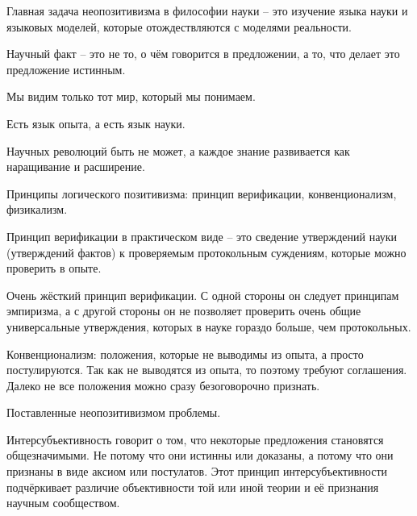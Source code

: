 \documentclass[main.tex]{subfiles}
\begin{document}
Главная задача неопозитивизма в философии науки -- это изучение языка науки и языковых моделей, которые отождествляются с моделями реальности.




Научный факт -- это не то, о чём говорится в предложении, а то, что делает это предложение истинным.

Мы видим только тот мир, который мы понимаем.

Есть язык опыта, а есть язык науки.

Научных революций быть не может, а каждое знание развивается как наращивание и расширение.

Принципы логического позитивизма: принцип верификации, конвенционализм, физикализм.



Принцип верификации в практическом виде -- это сведение утверждений науки (утверждений фактов) к проверяемым протокольным суждениям, которые можно проверить в опыте.

Очень жёсткий принцип верификации.
С одной стороны он следует принципам эмпиризма, а с другой стороны он не позволяет проверить очень общие универсальные утверждения, которых в науке гораздо больше, чем протокольных.



Конвенционализм: положения, которые не выводимы из опыта, а просто постулируются.
Так как не выводятся из опыта, то поэтому требуют соглашения.
Далеко не все положения можно сразу безоговорочно признать.



Поставленные неопозитивизмом проблемы.

Интерсубъективность говорит о том, что некоторые предложения становятся общезначимыми.
Не потому что они истинны или доказаны, а потому что они признаны в виде аксиом или постулатов.
Этот принцип интерсубъективности подчёркивает различие объективности той или иной теории и её признания научным сообществом.
\end{document}
